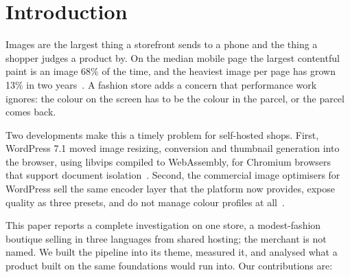 \documentclass[sigconf,nonacm,screen]{acmart}
\begin{document}

\maketitle

\section{Introduction}

Images are the largest thing a storefront sends to a phone and the thing a shopper judges a product by. On the median mobile page the largest contentful paint is an image 68\% of the time, and the heaviest image per page has grown 13\% in two years~\cite{almanac2024media}. A fashion store adds a concern that performance work ignores: the colour on the screen has to be the colour in the parcel, or the parcel comes back.

Two developments make this a timely problem for self-hosted shops. First, WordPress 7.1 moved image resizing, conversion and thumbnail generation into the browser, using libvips compiled to WebAssembly, for Chromium browsers that support document isolation~\cite{wp71devnote}. Second, the commercial image optimisers for WordPress sell the same encoder layer that the platform now provides, expose quality as three presets, and do not manage colour profiles at all~\cite{shortpixelkb}.

This paper reports a complete investigation on one store, a modest-fashion boutique selling in three languages from shared hosting; the merchant is not named. We built the pipeline into its theme, measured it, and analysed what a product built on the same foundations would run into. Our contributions are:
\end{document}
